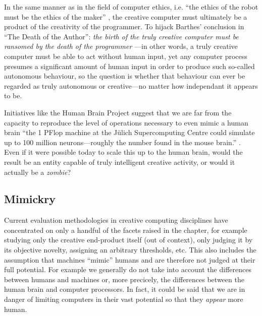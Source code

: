 In the same manner as in the field of computer ethics, i.e. ``the ethics of the robot must be the ethics of the maker'' \autocite{Mcbride2012}, the creative computer must ultimately be a product of the creativity of the programmer. To hijack Barthes' conclusion in ``The Death of the Author'': \textit{the birth of the truly creative computer must be ransomed by the death of the programmer} \autocite{Barthes1967}---in other words, a truly creative computer must be able to act without human input, yet any computer process presumes a significant amount of human input in order to produce such so-called autonomous behaviour, so the question is whether that behaviour can ever be regarded as truly autonomous or creative---no matter how independant it appears to be.

Initiatives like the Human Brain Project suggest that we are far from the capacity to reproduce the level of operations necessary to even mimic a human brain ``the 1 PFlop machine at the J{\"u}lich Supercomputing Centre could simulate up to 100 million neurons---roughly the number found in the mouse brain.'' \autocite{Walker2012}. Even if it were possible today to scale this up to the human brain, would the result be an entity capable of truly intelligent creative activity, or would it actually be a \textit{zombie}?



\subsection{Mimickry}

Current evaluation methodologies in creative computing disciplines have concentrated on only a handful of the facets raised in the  chapter, for example studying only the creative end-product itself (out of context), only judging it by its objective novelty, assigning an arbitrary thresholds, etc. This also includes the assumption that machines ``mimic'' humans and are therefore not judged at their full potential. For example we generally do not take into account the differences between humans and machines or, more precicely, the differences between the human brain and computer processors. In fact, it could be said that we are in danger of limiting computers in their vast potential so that they \textit{appear} more human.

